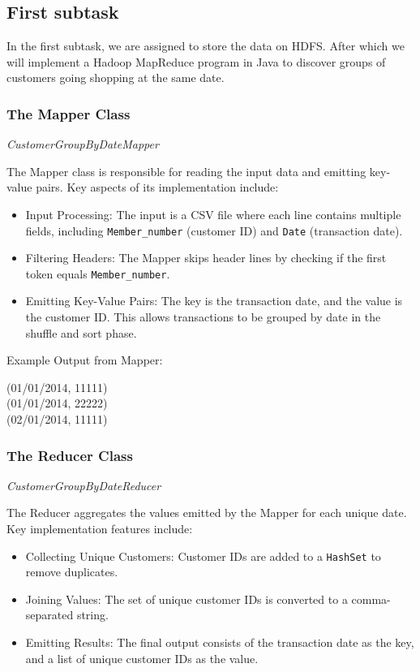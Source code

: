 \subsection{First subtask}
\label{subsec:first-subtask}

In the first subtask, we are assigned to store the data on HDFS.
After which we will implement a Hadoop MapReduce program in Java to discover groups of customers going shopping at the same date.

\subsubsection{The Mapper Class} \textit{CustomerGroupByDateMapper}

The Mapper class is responsible for reading the input data and emitting key-value pairs.
Key aspects of its implementation include:

\begin{itemize}
    \item Input Processing: The input is a CSV file where each line contains multiple fields, including \texttt{Member\_number} (customer ID) and \texttt{Date} (transaction date).
    \item Filtering Headers: The Mapper skips header lines by checking if the first token equals \texttt{Member\_number}.
    \item Emitting Key-Value Pairs: The key is the transaction date, and the value is the customer ID.
    This allows transactions to be grouped by date in the shuffle and sort phase.
\end{itemize}

Example Output from Mapper:
\begin{center}
(01/01/2014, 11111)\\
(01/01/2014, 22222)\\
(02/01/2014, 11111)
\end{center}

\subsubsection{The Reducer Class} \textit{CustomerGroupByDateReducer}

The Reducer aggregates the values emitted by the Mapper for each unique date.
Key implementation features include:

\begin{itemize}
    \item Collecting Unique Customers: Customer IDs are added to a \texttt{HashSet} to remove duplicates.
    \item Joining Values: The set of unique customer IDs is converted to a comma-separated string.
    \item Emitting Results: The final output consists of the transaction date as the key, and a list of unique customer IDs as the value.
\end{itemize}

